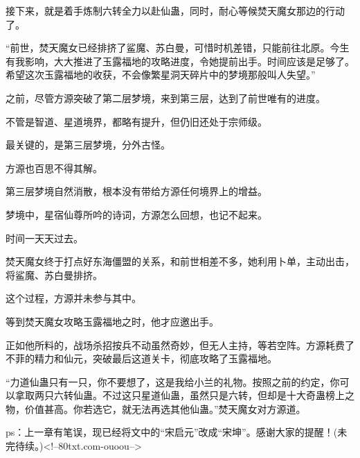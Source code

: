 \begin{this_body}
接下来，就是着手炼制六转全力以赴仙蛊，同时，耐心等候焚天魔女那边的行动了。

“前世，焚天魔女已经排挤了鲨魔、苏白曼，可惜时机差错，只能前往北原。今生有我影响，大大推进了玉露福地的攻略进度，令她提前出手。时间应该是足够了。希望这次玉露福地的收获，不会像繁星洞天碎片中的梦境那般叫人失望。”

之前，尽管方源突破了第二层梦境，来到第三层，达到了前世唯有的进度。

不管是智道、星道境界，都略有提升，但仍旧还处于宗师级。

最关键的，是第三层梦境，分外古怪。

方源也百思不得其解。

第三层梦境自然消散，根本没有带给方源任何境界上的增益。

梦境中，星宿仙尊所吟的诗词，方源怎么回想，也记不起来。

时间一天天过去。

焚天魔女终于打点好东海僵盟的关系，和前世相差不多，她利用卜单，主动出击，将鲨魔、苏白曼排挤。

这个过程，方源并未参与其中。

等到焚天魔女攻略玉露福地之时，他才应邀出手。

正如他所料的，战场杀招按兵不动虽然奇妙，但无人主持，等若空阵。方源耗费了不菲的精力和仙元，突破最后这道关卡，彻底攻略了玉露福地。

“力道仙蛊只有一只，你不要想了，这是我给小兰的礼物。按照之前的约定，你可以拿取两只六转仙蛊。不过这只星道仙蛊，虽然只是六转，但却是十大奇蛊榜上之物，价值甚高。你若选它，就无法再选其他仙蛊。”焚天魔女对方源道。

ps：上一章有笔误，现已经将文中的“宋启元”改成“宋坤”。感谢大家的提醒！(未完待续。)<!--80txt.com-ouoou-->

\end{this_body}

